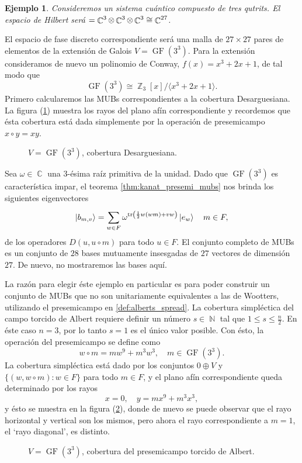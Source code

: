 \documentclass[a4paper,11pt]{report}
\DeclareMathOperator{\C}{\mathbb{C}}
\DeclareMathOperator{\N}{\mathbb{N}}
\DeclareMathOperator{\Z}{\mathbb{Z}}
\let\H\relax
\DeclareMathOperator{\H}{\mathcal H}
\DeclareMathOperator{\tr}{tr}
\DeclareMathOperator{\GF}{GF}
\newtheorem{example}{Ejemplo}
\begin{document}
  \begin{example}
    Consideremos un sistema cuántico compuesto de tres
    qutrits. El espacio de Hilbert será $\H = \C^{3} \otimes
    \C^{3} \otimes \C^{3} \cong \C^{27}$.   
    \label{ex:qs-3-3}
  \end{example}
  El espacio de fase discreto correspondiente será una malla
  de $27 \times 27$ pares de elementos de la extensión de
  Galois $V = \GF(3^{3})$. Para la extensión consideramos de
  nuevo un polinomio de Conway, $f(x) = x^3 + 2x + 1$, de
  tal modo que
  \[
    \GF(3^{3}) \cong \Z_3[x] / \langle x^3+2x+1 \rangle.
  \] 
  Primero calcularemos las MUBs correspondientes a la
  cobertura Desarguesiana. La figura
  (\ref{fig:3-3-desarguesian-plane}) muestra los rayos del
  plano afín correspondiente y recordemos que ésta cobertura
  está dada simplemente por la operación de presemicampo $x
  \circ y = xy$.
  \begin{figure}[ht]
    \centering
    
    \caption{$V = \GF(3^{3})$, cobertura Desarguesiana.}
    \label{fig:3-3-desarguesian-plane}
  \end{figure}
  Sea $\omega \in \C$ una $3$-ésima raíz primitiva de la
  unidad. Dado que $\GF(3^3)$ es característica impar, el
  teorema \ref{thm:kanat_presemi_mubs} nos brinda los
  siguientes eigenvectores
  \begin{equation}
    \ket{b_{m,v}}
    = \sum_{w \in F}^{}
    \omega^{\tr\left(
        \frac{1}{2} w(wm) + vw
    \right) } \ket{e_w}
    \quad m \in F,
  \end{equation}
  de los operadores $D(u,u \circ m)$ para todo $u \in F$. El
  conjunto completo de MUBs es un conjunto de $28$ bases
  mutuamente insesgadas de $27$ vectores de dimensión $27$.
  De nuevo, no mostraremos las bases aquí.

  La razón para elegir éste ejemplo en particular es para
  poder construir un conjunto de MUBs que no son
  unitariamente equivalentes a las de Wootters, utilizando
  el presemicampo en \ref{def:alberts_spread}. La cobertura
  simpléctica del campo torcido de Albert requiere definir
  un número $s \in \N$ tal que $1 \leq s \leq \frac{n}{2}$.
  En éste caso $n = 3$, por lo tanto $s = 1$ es el único
  valor posible. Con ésto, la operación del presemicampo se
  define como
  \[
    w \circ m
    = m w^{9} + m^{3}w^{3},
    \quad m \in \GF(3^{3}).
  \] 
  La cobertura simpléctica está dado por los conjuntos $0
  \oplus V$ y $\{(w,w\circ m) : w \in F\}$ para todo $m \in
  F$, y el plano afín correspondiente queda determinado por
  los rayos
  \[
    x = 0,
    \quad
    y = mx^{9} + m^3 x^3,
  \] 
  y ésto se muestra en la figura
  (\ref{fig:3-3-albert-plane}), donde de nuevo se puede
  observar que el rayo horizontal y vertical son los mismos,
  pero ahora el rayo correspondiente a $m = 1$, el `rayo
  diagonal', es distinto.
  \begin{figure}[ht]
    \centering
    \scalebox{1}{
      
    }
    \caption{$V = \GF(3^{3})$, cobertura del presemicampo
    torcido de Albert.}
    \label{fig:3-3-albert-plane}
  \end{figure}
\end{document}
